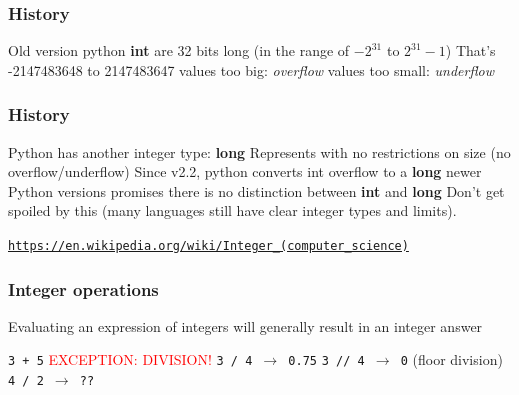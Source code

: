 \documentclass[11pt]{beamer}
\begin{document}
\begin{frame}
  \frametitle{History}
  \Enlarge

  \begin{itemize}
  \myitem Old version python {\bf int} are 32 bits long (in the range of $-2^{31}$ to $2^{31}-1$) 
  \myitem That's -2147483648 to 2147483647
  \myitem values too big: \emph{overflow}
  \myitem values too small: \emph{underflow}
  \end{itemize}
\end{frame}

\begin{frame}
  \frametitle{History}
  \Enlarge

  \begin{itemize}
  \myitem Python has another integer type: {\bf long} 
  \myitem Represents with no restrictions on size (no overflow/underflow) \pause
  \myitem Since v2.2, python converts int overflow to a {\bf long} \pause
  \myitem newer Python versions promises there is no distinction between {\bf int} and {\bf long} \pause
  \myitem Don't get spoiled by this (many languages still have clear integer types and limits).
  \end{itemize}
  
  \textcolor{blue}{\small \texttt{\url{https://en.wikipedia.org/wiki/Integer_(computer_science)}}} 
  
\end{frame}


\begin{frame}
  \frametitle{Integer operations}
  \Enlarge

  \begin{itemize}
  \myitem  Evaluating an expression of integers will generally result in an integer answer
    \begin{itemize}
    \mysubitem  \texttt{3 + 5} \pause
    \mysubitem  \textcolor{red}{EXCEPTION:  DIVISION!} \pause
    \mysubitem  \texttt{3 / 4 $\rightarrow$ 0.75} \pause
    \mysubitem  \texttt{3 // 4 $\rightarrow$ 0} (floor division)\pause
    \mysubitem  \texttt{4 / 2 $\rightarrow$ ??}
    \end{itemize}
  \end{itemize}
\end{frame}
\end{document}
